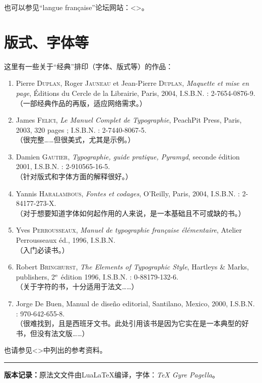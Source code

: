 也可以参见``langue française''论坛网站：<>。

\section{版式、字体等}\label{sec8.5}

这里有一些关于``经典''排印（字体、版式等）的作品：

\begin{enumerate}[resume]
    \item Pierre \textsc{Duplan}, Roger \textsc{Jauneau} et Jean-Pierre \textsc{Duplan}, \emph{Maquette et mise en page}, Éditions du Cercle de la Librairie, Paris, 2004, I.S.B.N. : 2-7654-0876-9. \\
    （一部经典作品的再版，适应网络需求。）\label{ref19}
    \item James \textsc{Felici}, \emph{Le Manuel Complet de Typographie}, PeachPit Press, Paris, 2003, 320 pages ; I.S.B.N. : 2-7440-8067-5.\\
    （很完整……但很美式，尤其是示例。）\label{ref20}
    \item Damien \textsc{Gautier}, \emph{Typographie, guide pratique, Pyramyd}, seconde édition 2001, I.S.B.N. : 2-910565-16-5.\\
    （针对版式和字体方面的解释很好。）\label{ref21}
    \item Yannis \textsc{Haralambous}, \emph{Fontes et codages}, O'Reilly, Paris, 2004, I.S.B.N. : 2-84177-273-X.\\
    （对于想要知道字体如何起作用的人来说，是一本基础且不可或缺的书。）\label{ref22}
    \item Yves \textsc{Perrousseaux}, \emph{Manuel de typographie française élémentaire}, Atelier Perrousseaux éd., 1996, I.S.B.N.\\ 
    （入门必读书。）\label{ref23}
    \item Robert \textsc{Bringhurst}, \emph{The Elements of Typographic Style}, Hartleys \& Marks, publishers, 2$^{\rm e}$ édition 1996, I.S.B.N. : 0-88179-132-6.\\
    （关于字符的书，十分适用于法文……）\label{ref24}
    \item Jorge De Buen, Manual de diseño editorial, Santilano, Mexico, 2000, I.S.B.N. : 970-642-655-8.\\
    （很难找到，且是西班牙文书。此处引用该书是因为它实在是一本典型的好书，但没有法文版……）\label{ref25}
\end{enumerate}

也请参见<>中列出的参考资料。

\vfill

\begin{center}
    \rule{.75\linewidth}{.5pt}

    \textbf{版本记录：}原法文文件由Lua\LaTeX 编译，字体：\emph{TeX Gyre Pagella}。
\end{center}
